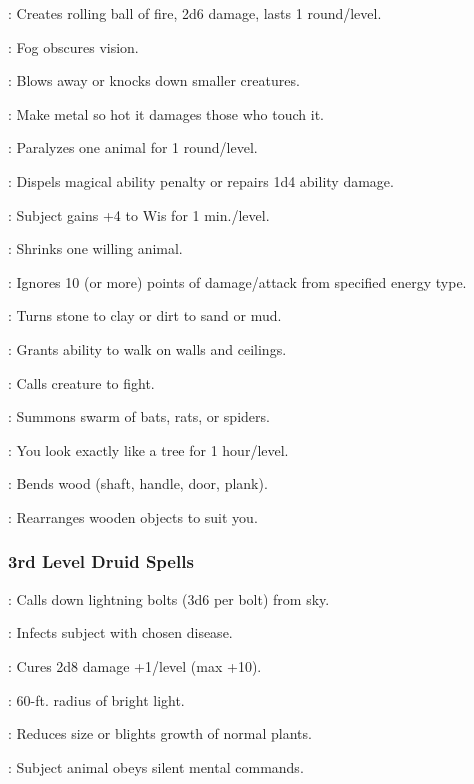 : Creates rolling ball of fire, 2d6 damage, lasts 1 round/level.

: Fog obscures vision.

: Blows away or knocks down smaller creatures.

: Make metal so hot it damages those who touch it.

: Paralyzes one animal for 1 round/level.

: Dispels magical ability penalty or repairs 1d4 ability damage.

: Subject gains +4 to Wis for 1 min./level.

: Shrinks one willing animal.

: Ignores 10 (or more) points of damage/attack from specified energy type.

: Turns stone to clay or dirt to sand or mud.

: Grants ability to walk on walls and ceilings.

: Calls creature to fight.

: Summons swarm of bats, rats, or spiders.

: You look exactly like a tree for 1 hour/level.

: Bends wood (shaft, handle, door, plank).

: Rearranges wooden objects to suit you.

\subsubsection{3rd Level Druid Spells}

: Calls down lightning bolts (3d6 per bolt) from sky.

: Infects subject with chosen disease.

: Cures 2d8 damage +1/level (max +10).

: 60-ft. radius of bright light.

: Reduces size or blights growth of normal plants.

: Subject animal obeys silent mental commands.

